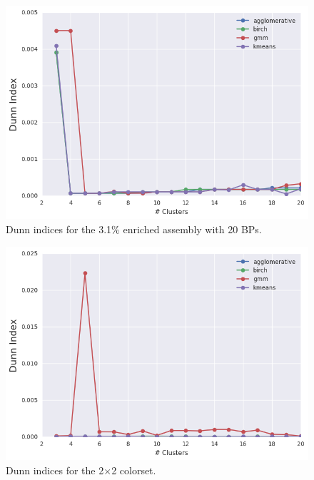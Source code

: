 \begin{figure}[h!]
\centering
\includegraphics[width=0.87\linewidth]{figures/results/model-select/assm-31-20BPs/dunn-combined-U238-capture-1}
\vspace{2mm}
\caption[Dunn indices for the 3.1\% enriched assembly with 20 BPs]{Dunn indices for the 3.1\% enriched assembly with 20 \acp{BP}.}
\label{fig:chap11-assm-31-20BPs-dunn-index}
\end{figure}

\clearpage

\begin{figure}[h!]
\centering
\includegraphics[width=0.87\linewidth]{figures/results/model-select/2x2/dunn-combined-U238-capture-1}
\vspace{2mm}
\caption[Dunn indices for the 2$\times$2 colorset]{Dunn indices for the 2$\times$2 colorset.}
\label{fig:chap11-2x2-dunn-index}
\end{figure}

